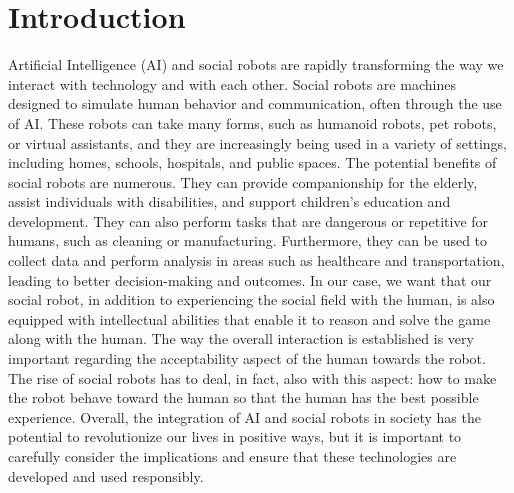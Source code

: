 \documentclass{article}
\begin{document}
\section{Introduction}
Artificial Intelligence (AI) and social robots are rapidly transforming the way we interact with technology and with each other. Social robots are machines designed to simulate human behavior and communication, often through the use of AI. These robots can take many forms, such as humanoid robots, pet robots, or virtual assistants, and they are increasingly being used in a variety of settings, including homes, schools, hospitals, and public spaces.
\noindent The potential benefits of social robots are numerous. They can provide companionship for the elderly, assist individuals with disabilities, and support children's education and development. They can also perform tasks that are dangerous or repetitive for humans, such as cleaning or manufacturing. Furthermore, they can be used to collect data and perform analysis in areas such as healthcare and transportation, leading to better decision-making and outcomes. In our case, we want that our social robot, in addition to experiencing the social field with the human, is also equipped with intellectual abilities that enable it to reason and solve the game along with the human.
\noindent The way the overall interaction is established is very important regarding the acceptability aspect of the human towards the robot. The rise of social robots has to deal, in fact, also with this aspect: how to make the robot behave toward the human so that the human has the best possible experience. 
\noindent Overall, the integration of AI and social robots in society has the potential to revolutionize our lives in positive ways, but it is important to carefully consider the implications and ensure that these technologies are developed and used responsibly.
\end{document}
